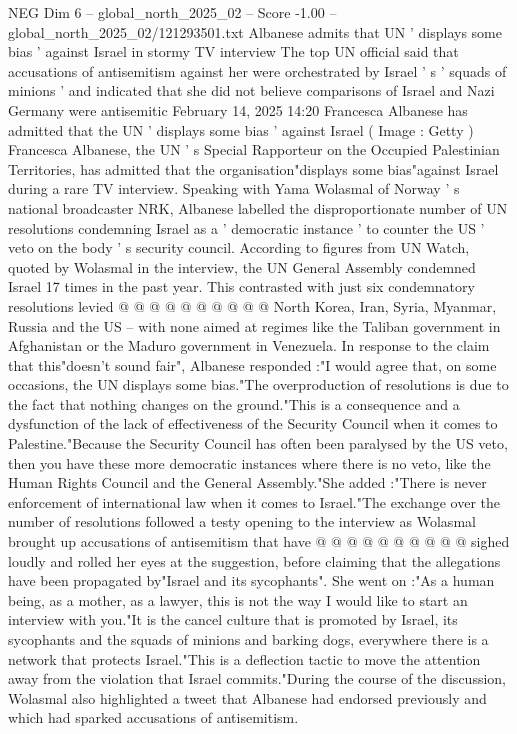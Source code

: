\begin{textsample}{NEG Dim 6 – global\_north\_2025\_02 – Score -1.00 – global\_north\_2025\_02/121293501.txt}  \label{ex:f6_neg_077}
Albanese admits that UN ' displays some bias ' against Israel in stormy TV interview The top UN official said that accusations of antisemitism against her were orchestrated by Israel ' s ' squads of minions ' and indicated that she did not believe comparisons of Israel and Nazi Germany were antisemitic February 14, 2025 14:20 Francesca Albanese has admitted that the UN ' displays some bias ' against Israel ( Image : Getty ) Francesca Albanese, the UN ' s Special Rapporteur on the Occupied Palestinian Territories, has admitted that the organisation"displays some bias"against Israel during a rare TV interview.
Speaking with Yama Wolasmal of Norway ' s national broadcaster NRK, Albanese labelled the disproportionate number of UN resolutions condemning Israel as a ' democratic instance ' to counter the US ' veto on the body ' s security council.
According to figures from UN Watch, quoted by Wolasmal in the interview, the UN General Assembly condemned Israel 17 times in the past year.
This contrasted with just six condemnatory resolutions levied @ @ @ @ @ @ @ @ @ @ North Korea, Iran, Syria, Myanmar, Russia and the US -- with none aimed at regimes like the Taliban government in Afghanistan or the Maduro government in Venezuela.
In response to the claim that this"doesn't sound fair", Albanese responded :"I would agree that, on some occasions, the UN displays some bias."The overproduction of resolutions is due to the fact that nothing changes on the ground."This is a consequence and a dysfunction of the lack of effectiveness of the Security Council when it comes to Palestine."Because the Security Council has often been paralysed by the US veto, then you have these more democratic instances where there is no veto, like the Human Rights Council and the General Assembly."She added :"There is never enforcement of international law when it comes to Israel."The exchange over the number of resolutions followed a testy opening to the interview as Wolasmal brought up accusations of antisemitism that have @ @ @ @ @ @ @ @ @ @ sighed loudly and rolled her eyes at the suggestion, before claiming that the allegations have been propagated by"Israel and its sycophants".
She went on :"As a human being, as a mother, as a lawyer, this is not the way I would like to start an interview with you."It is the cancel culture that is promoted by Israel, its sycophants and the squads of minions and barking dogs, everywhere there is a network that protects Israel."This is a deflection tactic to move the attention away from the violation that Israel commits."During the course of the discussion, Wolasmal also highlighted a tweet that Albanese had endorsed previously and which had sparked accusations of antisemitism.

\end{textsample}
